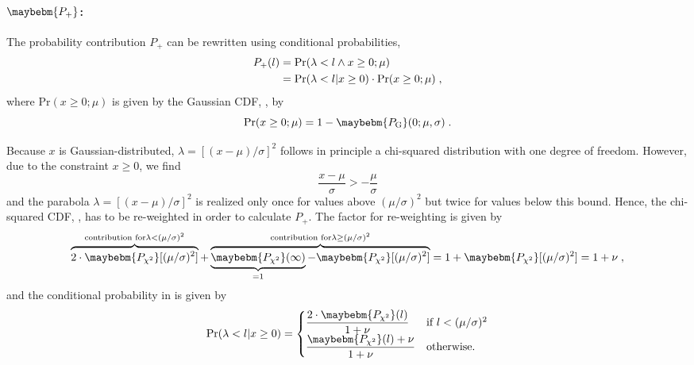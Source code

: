 \documentclass[a4paper]{article}
\newcommand*\Prob{\mathrm{Pr}}
\newcommand*\PG{\maybebm{P_\mathrm{G}}\xspace}
\newcommand*\Pchi{\maybebm{P_{\chi^2}}\xspace}
\begin{document}
\paragraph{$\maybebm{P_+}$:}
The probability contribution $P_+$ can be rewritten using conditional
probabilities,
%
\begin{align}
  P_+(l)
  & = \Prob(\lambda < l \wedge x \geq 0; \mu)
  \nonumber
  \\
  & = \Prob(\lambda < l | x \geq 0) \cdot \Prob(x \geq 0; \mu)
  \label{eq:p:plus:conditional}
  \fcomma
\end{align}
%
where $\Prob(x \geq 0; \mu)$ is given by the Gaussian CDF, \PG, by
%
\begin{equation}
  \label{eq:p:plus:prior}
  \Prob(x \geq 0; \mu) = 1 - \PG(0; \mu, \sigma)
  \fstop
\end{equation}
%

Because $x$ is Gaussian-distributed, 
$\lambda = [(x-\mu)/\sigma]^2$ follows in principle a
chi-squared distribution with one degree of freedom. However, due to the
constraint $x \geq 0$, we find
%
\begin{equation*}
  \frac{x-\mu}{\sigma} > -\frac{\mu}{\sigma}
\end{equation*}
%
and the parabola $\lambda=[(x-\mu)/\sigma]^2$ is realized only once
for values above $(\mu/\sigma)^2$ but twice for values below this
bound. Hence, the chi-squared CDF, \Pchi, has to be re-weighted
in order to calculate $P_+$. The factor for re-weighting is given by
\begin{equation*}
  \overbrace{2 \cdot \Pchi[(\mu/\sigma)^2]}^{\text{contribution
  for} \lambda < (\mu/\sigma)^2} +
  \overbrace{
    \underbrace{\Pchi(\infty)}_{=1} - \Pchi[(\mu/\sigma)^2]
}^{\text{contribution
  for} \lambda \geq (\mu/\sigma)^2}
  = 1 + \Pchi[(\mu/\sigma)^2]
  = 1 + \nu
     \fcomma
\end{equation*}
and the conditional probability in  is given
by
%
\begin{equation}
  \label{eq:p:plus:conditional:only}
  \Prob(\lambda < l | x \geq 0) =
  \begin{cases}
    \displaystyle
    \frac{2 \cdot \Pchi(l)}{1+\nu} & \text{if } l < (\mu/\sigma)^2
    \\
    \displaystyle
    \frac{\Pchi(l) + \nu}{1 + \nu} & \text{otherwise.}
  \end{cases}
\end{equation}
%
\end{document}
